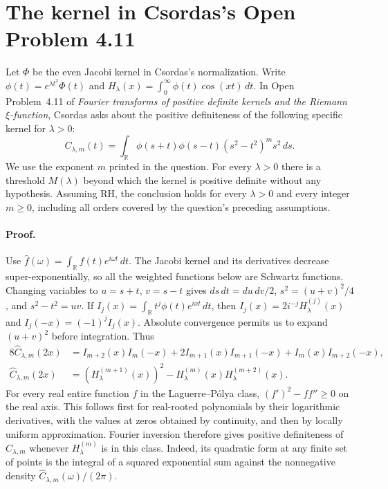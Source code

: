 \documentclass[11pt,a4paper]{article}
\begin{document}
\section{The kernel in Csordas's Open Problem 4.11}
Let $\Phi$ be the even Jacobi kernel in Csordas's normalization. Write
$\phi(t)=e^{\lambda t^2}\Phi(t)$ and
$H_\lambda(x)=\int_0^\infty\phi(t)\cos(xt)\,dt$. In Open Problem~4.11
of \emph{Fourier transforms of positive definite kernels and the Riemann
$\xi$-function}, Csordas \cite{cs15} asks about the positive definiteness of the
following specific kernel for $\lambda>0$:
\[
 C_{\lambda,m}(t)=\int_{\mathbb R}\phi(s+t)\phi(s-t)
                        (s^2-t^2)^m s^2\,ds.
\]
We use the exponent $m$ printed in the question. For every $\lambda>0$
there is a threshold $M(\lambda)$ beyond which the kernel is positive
definite without any hypothesis. Assuming RH, the conclusion holds for
every $\lambda>0$ and every integer $m\ge0$, including all orders
covered by the question's preceding assumptions.

\paragraph{Proof.} Use $\widehat f(\omega)=\int_{\mathbb R}f(t)e^{i\omega t}\,dt$.
The Jacobi kernel and its derivatives decrease super-exponentially, so all the
weighted functions below are Schwartz functions. Changing variables to
$u=s+t$, $v=s-t$ gives $ds\,dt=du\,dv/2$, $s^2=(u+v)^2/4$, and
$s^2-t^2=uv$. If $I_j(x)=\int_{\mathbb R}t^j\phi(t)e^{ixt}\,dt$, then
$I_j(x)=2i^{-j}H_\lambda^{(j)}(x)$ and $I_j(-x)=(-1)^jI_j(x)$.
Absolute convergence permits us to expand $(u+v)^2$ before integration.
Thus
\begin{align*}
 8\widehat C_{\lambda,m}(2x)
 &= I_{m+2}(x)I_m(-x)+2I_{m+1}(x)I_{m+1}(-x)+I_m(x)I_{m+2}(-x),\\
 \widehat C_{\lambda,m}(2x)
 &= (H_\lambda^{(m+1)}(x))^2-H_\lambda^{(m)}(x)H_\lambda^{(m+2)}(x).
\end{align*}
For every real entire function $f$ in the Laguerre--P\'olya class,
$(f')^2-ff''\ge0$ on the real axis. This follows first for real-rooted
polynomials by their logarithmic derivatives, with the values at zeros
obtained by continuity, and then by locally uniform approximation.
Fourier inversion therefore gives positive definiteness of
$C_{\lambda,m}$ whenever $H_\lambda^{(m)}$ is in this class.
Indeed, its quadratic form at any finite set of points is the integral
of a squared exponential sum against the nonnegative density
$\widehat C_{\lambda,m}(\omega)/(2\pi)$.
\end{document}
